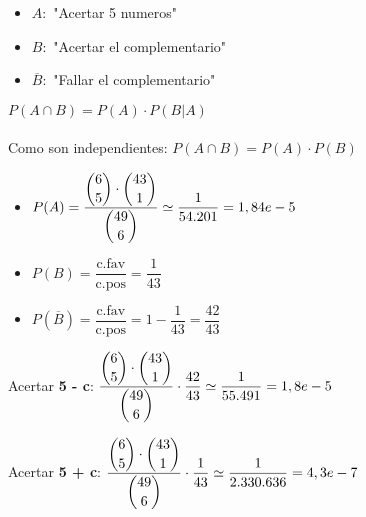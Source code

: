 \documentclass{article}
\begin{document}
\begin{itemize}
    \item $A:$ "Acertar 5 numeros"
    \item $B:$ "Acertar el complementario"
    \item $\overline{B}:$ "Fallar el complementario"
\end{itemize}
$P(A \cap B) = P(A) \cdot P(B | A)$ \\\\
Como son independientes: $P(A \cap B) = P(A) \cdot P(B)$
\begin{itemize}
    \item $P(A) = \dfrac{\dbinom{6}{5} \cdot \dbinom{43}{1}}{\dbinom{49}{6}} \simeq \dfrac{1}{54.201
} = 1,84e-5$ 
    \item $P(B) = \dfrac{\text{c.fav}}{\text{c.pos}} = \dfrac{1}{43}$
    \item $P(\overline{B}) = \dfrac{\text{c.fav}}{\text{c.pos}} = 1 - \dfrac{1}{43} = \dfrac{42}{43}$
\end{itemize}

Acertar \textbf{5 - c}: $\dfrac{\dbinom{6}{5} \cdot \dbinom{43}{1}}{\dbinom{49}{6}} \cdot \dfrac{42}{43} \simeq \dfrac{1}{55.491} = 1,8e-5$ 

Acertar \textbf{5 + c}: $\dfrac{\dbinom{6}{5} \cdot \dbinom{43}{1}}{\dbinom{49}{6}} \cdot \dfrac{1}{43} \simeq \dfrac{1}{2.330.636} = 4,3e-7$ 
\end{document}
